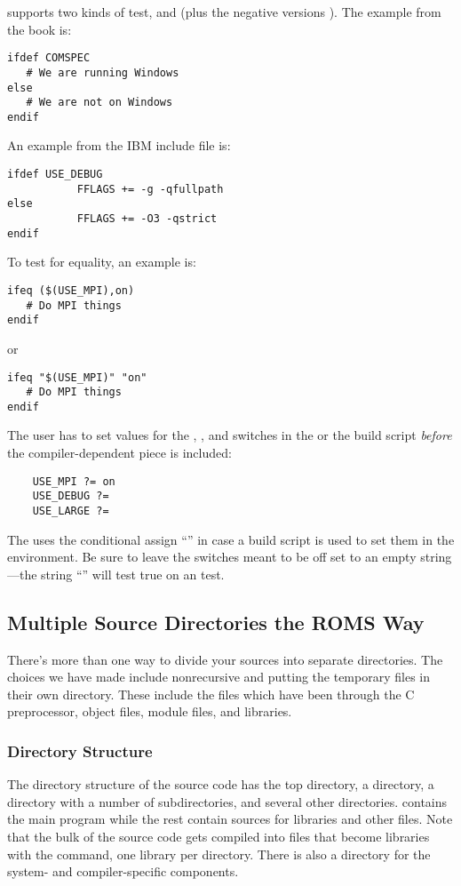  supports two kinds of  test,  and
 (plus the
negative versions ). The example from the book is:
\begin{verbatim}
ifdef COMSPEC
   # We are running Windows
else
   # We are not on Windows
endif
\end{verbatim}
An example from the IBM include file is:
\begin{verbatim}
ifdef USE_DEBUG
           FFLAGS += -g -qfullpath
else
           FFLAGS += -O3 -qstrict
endif
\end{verbatim}
To test for equality, an example is:
\begin{verbatim}
ifeq ($(USE_MPI),on)
   # Do MPI things
endif
\end{verbatim}
or 
\begin{verbatim}
ifeq "$(USE_MPI)" "on"
   # Do MPI things
endif
\end{verbatim}
The user has to set values for the , ,
and  switches in the  or the build
script {\em before} the compiler-dependent piece is included:
\begin{verbatim}
    USE_MPI ?= on
    USE_DEBUG ?=
    USE_LARGE ?=
\end{verbatim}
The  uses the conditional assign ``''
in case a build script is used to set them in the environment.
Be sure to leave the switches meant to be off set to an empty string---the
string ``'' will test true on an  test.

\subsection{Multiple Source Directories the ROMS Way}
\label{Mult_dir_make}

There's more than one way to divide your sources into separate
directories. The choices we have made include nonrecursive 
and putting the temporary files in their own 
directory. These include the  files which have been through
the C preprocessor, object files, module files, and libraries.

\subsubsection{Directory Structure}

The directory structure of the source code has the top directory,
a  directory, a  directory with a number of
subdirectories, and several other directories.  contains
the main program while the rest contain sources for libraries and
other files. Note that the bulk of the source code gets compiled into
files that become libraries with the  command, one library per
directory. There is also a  directory for the system-
and compiler-specific  components.

